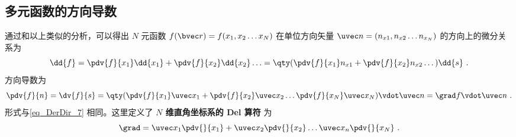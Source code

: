 \subsection{多元函数的方向导数}
通过和以上类似的分析，可以得出 $N$ 元函数 $f(\bvec r) = f(x_1,x_2\dots x_N)$ 在单位方向矢量 $\uvec n = (n_{x1}, n_{x2} \dots n_{x_N})$ 的方向上的微分关系为
\begin{equation}
\dd{f} = \pdv{f}{x_1} \dd{x_1} + \pdv{f}{x_2} \dd{x_2}\ldots = \qty( \pdv{f}{x_1}n_{x1} + \pdv{f}{x_2} n_{x2}\dots ) \dd{s}~.
\end{equation}
方向导数为
\begin{equation}
\pdv{f}{n} = \dv{f}{s} = \qty( \pdv{f}{x_1}\uvec x_1 + \pdv{f}{x_2}\uvec x_2\ldots  \pdv{f}{x_N}\uvec x_N ) \vdot \uvec n = \grad f \vdot \uvec n~.
\end{equation} 
形式与\autoref{eq_DerDir_7} 相同。这里定义了\textbf{ $N$ 维直角坐标系的 Del 算符} 为
\begin{equation}
\grad  = \uvec x_1\pdv{}{x_1} + \uvec x_2\pdv{}{x_2} \dots \uvec x_n\pdv{}{x_N}~.
\end{equation}


